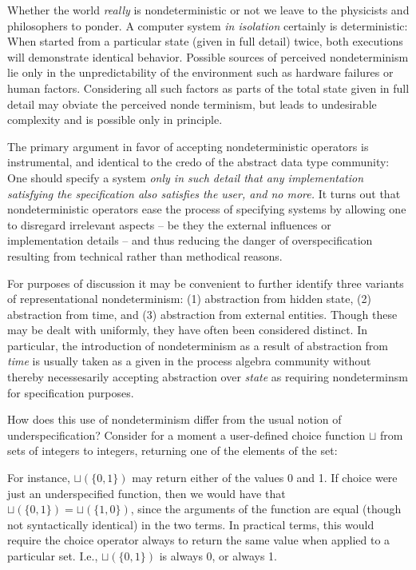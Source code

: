\documentclass[10pt]{article}
\begin{document}
Whether the world {\em really} is 
nondeterministic or not we leave to the physicists and 
phi\-lo\-sophers to ponder. A computer system {\em in isolation}
 certainly is deterministic: When started from a particular state 
(given in full detail) twice, both executions will demonstrate 
identical behavior. Possible sources of perceived nondeterminism lie 
only in the unpredictability of the environment such as hardware failures or human 
factors. Considering all such factors as parts of the total state 
given in full detail may obviate the perceived nonde\-
terminism, but leads to undesirable complexity and is possible only 
in principle.

The primary argument in favor of accepting nondeterministic operators 
is instrumental, and identical to the credo of the abstract data type 
community: One should specify a system {\em 
only in such detail that any implementation satisfying the 
specification also satisfies the user, and no more.} It turns out 
that nondeterministic operators ease the process of specifying 
systems by allowing one to disregard irrelevant aspects  -- 
be they the external influences or implementation details --  
and thus reducing the danger of over\-specification resulting from 
technical rather than methodical reasons. 

For purposes of discussion it may be convenient to further identify 
three variants of representational nondeterminism: 
(1) abstraction from hidden state, (2) 
abstraction from time, and (3) abstraction from external entities. 
Though these may be dealt with uniformly, they have often been 
considered distinct. In particular, the introduction of 
nonde\-terminism as a result of 
abstraction from {\em time} is usually taken as a given in the process 
alge\-bra community without thereby necessesarily accepting 
abstraction over {\em state} as requiring nondeterminsm for specification purposes.

 How does this use of nondeterminism differ 
from the usual notion of under\-specifica\-tion? Consider for a 
moment a user-defined choice function $\sqcup$ from sets of 
integers to integers, returning one of the elements of the set:

 For instance, $\sqcup(\{0,1\})$ may return 
either of the values 0 and 1. If choice were just an under\-specified 
function, then we would have that $\sqcup(\{0,1\})=\sqcup(\{1,0\})$, 
since the arguments of the function are equal (though not 
syntactically identical) in the two terms. In practical terms, this 
would require the choice operator always to return the same value 
when applied to a particular set. I.e., $\sqcup(\{0,1\})$ is always 0, or always 1.
\end{document}
